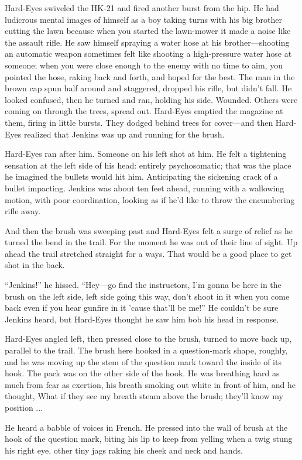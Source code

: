 Hard-Eyes swiveled the HK-21 and fired another burst from the hip. He had ludicrous mental images of himself as a boy taking turns with his big brother cutting the lawn because when you started the lawn-mower it made a noise like the assault rifle. He saw himself spraying a water hose at his brother—shooting an automatic weapon sometimes felt like shooting a high-pressure water hose at someone; when you were close enough to the enemy with no time to aim, you pointed the hose, raking back and forth, and hoped for the best. The man in the brown cap spun half around and staggered, dropped his rifle, but didn't fall. He looked confused, then he turned and ran, holding his side. Wounded. Others were coming on through the trees, spread out. Hard-Eyes emptied the magazine at them, firing in little bursts. They dodged behind trees for cover—and then Hard-Eyes realized that Jenkins was up and running for the brush.

Hard-Eyes ran after him. Someone on his left shot at him. He felt a tightening sensation at the left side of his head: entirely psychosomatic; that was the place he imagined the bullets would hit him. Anticipating the sickening crack of a bullet impacting. Jenkins was about ten feet ahead, running with a wallowing motion, with poor coordination, looking as if he'd like to throw the encumbering rifle away.

And then the brush was sweeping past and Hard-Eyes felt a surge of relief as he turned the bend in the trail. For the moment he was out of their line of sight. Up ahead the trail stretched straight for a ways. That would be a good place to get shot in the back.

``Jenkins!'' he hissed. ``Hey—go find the instructors, I'm gonna be here in the brush on the left side, left side going this way, don't shoot in it when you come back even if you hear gunfire in it 'cause that'll be me!'' He couldn't be sure Jenkins heard, but Hard-Eyes thought he saw him bob his head in response.

Hard-Eyes angled left, then pressed close to the brush, turned to move back up, parallel to the trail. The brush here hooked in a question-mark shape, roughly, and he was moving up the stem of the question mark toward the inside of its hook. The pack was on the other side of the hook. He was breathing hard as much from fear as exertion, his breath smoking out white in front of him, and he thought, What if they see my breath steam above the brush; they'll know my position ...

He heard a babble of voices in French. He pressed into the wall of brush at the hook of the question mark, biting his lip to keep from yelling when a twig stung his right eye, other tiny jags raking his cheek and neck and hands.

